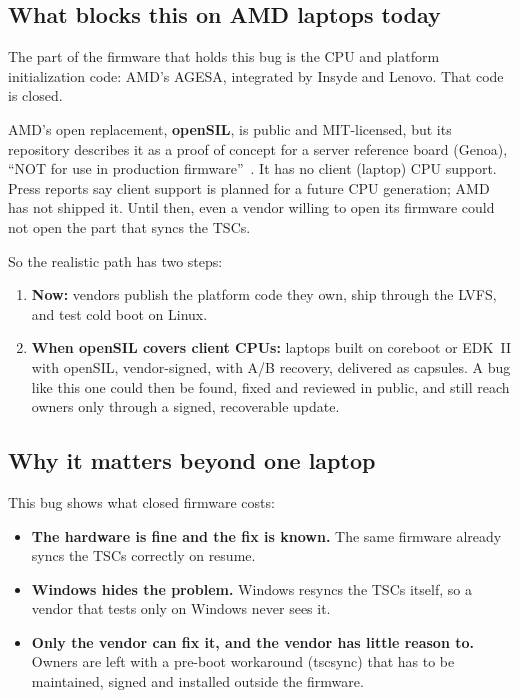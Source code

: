 \documentclass[11pt,a4paper]{article}
\begin{document}
\subsection{What blocks this on AMD laptops today}

The part of the firmware that holds this bug is the CPU and platform
initialization code: AMD's AGESA, integrated by Insyde and Lenovo. That code
is closed.

AMD's open replacement, \textbf{openSIL}, is public and MIT-licensed, but its
repository describes it as a proof of concept for a server reference board
(Genoa), ``NOT for use in production firmware''~\cite{opensil}. It has no
client (laptop) CPU support. Press reports say client support is planned for
a future CPU generation; AMD has not shipped it. Until then, even a vendor
willing to open its firmware could not open the part that syncs the TSCs.

So the realistic path has two steps:
\begin{enumerate}
\item \textbf{Now:} vendors publish the platform code they own, ship through
  the LVFS, and test cold boot on Linux.
\item \textbf{When openSIL covers client CPUs:} laptops built on coreboot or
  EDK~II with openSIL, vendor-signed, with A/B recovery, delivered as
  capsules. A bug like this one could then be found, fixed and reviewed in
  public, and still reach owners only through a signed, recoverable update.
\end{enumerate}

\subsection{Why it matters beyond one laptop}

This bug shows what closed firmware costs:
\begin{itemize}
\item \textbf{The hardware is fine and the fix is known.} The same firmware
  already syncs the TSCs correctly on resume.
\item \textbf{Windows hides the problem.} Windows resyncs the TSCs itself, so
  a vendor that tests only on Windows never sees it.
\item \textbf{Only the vendor can fix it, and the vendor has little reason
  to.} Owners are left with a pre-boot workaround (tscsync) that has to be
  maintained, signed and installed outside the firmware.
\end{itemize}
\end{document}

